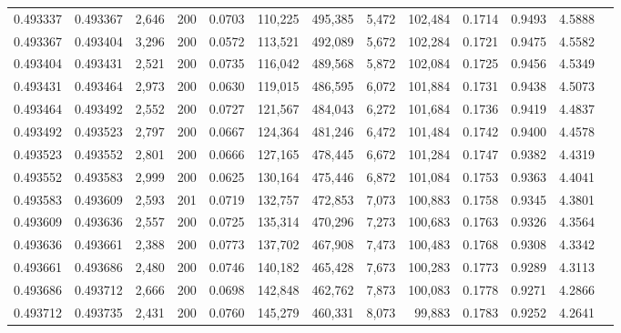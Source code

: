 \begin{tabular}{rrrrrrrrrrrrr}
0.493337 & 0.493367 & 2,646 & 200 &                                     0.0703 & 110,225 & 495,385 &   5,472 & 102,484 & 0.1714 & 0.9493 & 4.5888 \\
0.493367 & 0.493404 & 3,296 & 200 &                                     0.0572 & 113,521 & 492,089 &   5,672 & 102,284 & 0.1721 & 0.9475 & 4.5582 \\
0.493404 & 0.493431 & 2,521 & 200 &                                     0.0735 & 116,042 & 489,568 &   5,872 & 102,084 & 0.1725 & 0.9456 & 4.5349 \\
0.493431 & 0.493464 & 2,973 & 200 &                                     0.0630 & 119,015 & 486,595 &   6,072 & 101,884 & 0.1731 & 0.9438 & 4.5073 \\
0.493464 & 0.493492 & 2,552 & 200 &                                     0.0727 & 121,567 & 484,043 &   6,272 & 101,684 & 0.1736 & 0.9419 & 4.4837 \\
0.493492 & 0.493523 & 2,797 & 200 &                                     0.0667 & 124,364 & 481,246 &   6,472 & 101,484 & 0.1742 & 0.9400 & 4.4578 \\
0.493523 & 0.493552 & 2,801 & 200 &                                     0.0666 & 127,165 & 478,445 &   6,672 & 101,284 & 0.1747 & 0.9382 & 4.4319 \\
0.493552 & 0.493583 & 2,999 & 200 &                                     0.0625 & 130,164 & 475,446 &   6,872 & 101,084 & 0.1753 & 0.9363 & 4.4041 \\
0.493583 & 0.493609 & 2,593 & 201 &                                     0.0719 & 132,757 & 472,853 &   7,073 & 100,883 & 0.1758 & 0.9345 & 4.3801 \\
0.493609 & 0.493636 & 2,557 & 200 &                                     0.0725 & 135,314 & 470,296 &   7,273 & 100,683 & 0.1763 & 0.9326 & 4.3564 \\
0.493636 & 0.493661 & 2,388 & 200 &                                     0.0773 & 137,702 & 467,908 &   7,473 & 100,483 & 0.1768 & 0.9308 & 4.3342 \\
0.493661 & 0.493686 & 2,480 & 200 &                                     0.0746 & 140,182 & 465,428 &   7,673 & 100,283 & 0.1773 & 0.9289 & 4.3113 \\
0.493686 & 0.493712 & 2,666 & 200 &                                     0.0698 & 142,848 & 462,762 &   7,873 & 100,083 & 0.1778 & 0.9271 & 4.2866 \\
0.493712 & 0.493735 & 2,431 & 200 &                                     0.0760 & 145,279 & 460,331 &   8,073 &  99,883 & 0.1783 & 0.9252 & 4.2641 \\

\end{tabular}
